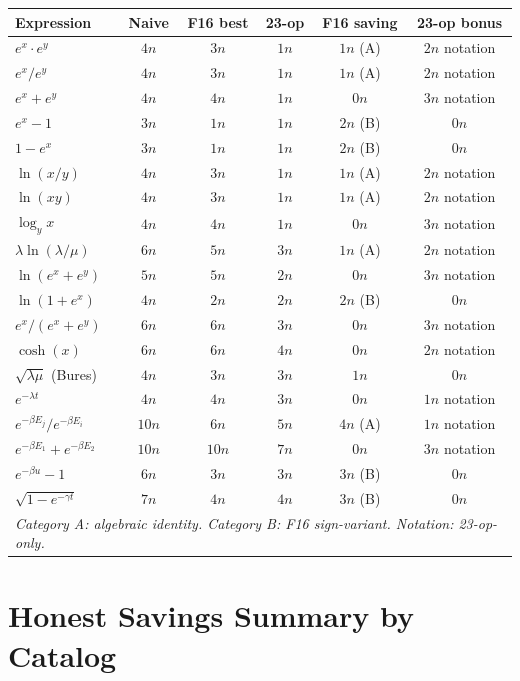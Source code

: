 \documentclass[11pt]{article}
\begin{document}
\begin{center}
\renewcommand{\arraystretch}{1.3}
\begin{tabular}{lccccc}
\toprule
Expression & Naive & F16 best & 23-op & F16 saving & 23-op bonus \\
\midrule
$e^x\cdot e^y$ & $4n$ & $3n$ & $1n$ & $1n$ (A) & $2n$ notation \\
$e^x/e^y$ & $4n$ & $3n$ & $1n$ & $1n$ (A) & $2n$ notation \\
$e^x+e^y$ & $4n$ & $4n$ & $1n$ & $0n$ & $3n$ notation \\
$e^x-1$ & $3n$ & $1n$ & $1n$ & $2n$ (B) & $0n$ \\
$1-e^x$ & $3n$ & $1n$ & $1n$ & $2n$ (B) & $0n$ \\
$\ln(x/y)$ & $4n$ & $3n$ & $1n$ & $1n$ (A) & $2n$ notation \\
$\ln(xy)$ & $4n$ & $3n$ & $1n$ & $1n$ (A) & $2n$ notation \\
$\log_y x$ & $4n$ & $4n$ & $1n$ & $0n$ & $3n$ notation \\
$\lambda\ln(\lambda/\mu)$ & $6n$ & $5n$ & $3n$ & $1n$ (A) & $2n$ notation \\
$\ln(e^x+e^y)$ & $5n$ & $5n$ & $2n$ & $0n$ & $3n$ notation \\
$\ln(1+e^x)$ & $4n$ & $2n$ & $2n$ & $2n$ (B) & $0n$ \\
$e^x/(e^x+e^y)$ & $6n$ & $6n$ & $3n$ & $0n$ & $3n$ notation \\
$\cosh(x)$ & $6n$ & $6n$ & $4n$ & $0n$ & $2n$ notation \\
$\sqrt{\lambda\mu}$ (Bures) & $4n$ & $3n$ & $3n$ & $1n$ & $0n$ \\
$e^{-\lambda t}$ & $4n$ & $4n$ & $3n$ & $0n$ & $1n$ notation \\
$e^{-\beta E_j}/e^{-\beta E_i}$ & $10n$ & $6n$ & $5n$ & $4n$ (A) & $1n$ notation \\
$e^{-\beta E_1}+e^{-\beta E_2}$ & $10n$ & $10n$ & $7n$ & $0n$ & $3n$ notation \\
$e^{-\beta u}-1$ & $6n$ & $3n$ & $3n$ & $3n$ (B) & $0n$ \\
$\sqrt{1-e^{-\gamma t}}$ & $7n$ & $4n$ & $4n$ & $3n$ (B) & $0n$ \\
\midrule
\multicolumn{6}{l}{\textit{Category A: algebraic identity. Category B: F16 sign-variant. Notation: 23-op-only.}} \\
\bottomrule
\end{tabular}
\end{center}

\section{Honest Savings Summary by Catalog}
\end{document}
